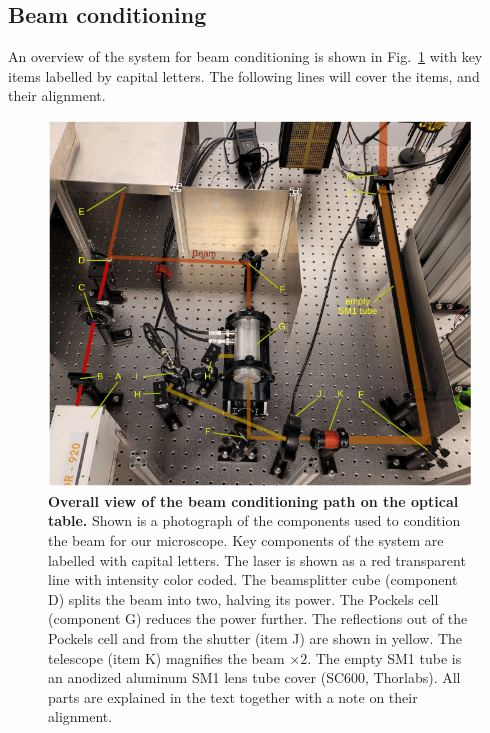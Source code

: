 \documentclass[10pt,letterpaper]{article}
\begin{document}
\subsection{Beam conditioning}
An overview of the system for beam conditioning is shown in Fig.~\ref{sfig1} with key items labelled by capital letters. The following lines will cover the items, and their alignment.
%
\begin{figure}[!t]
    \includegraphics[width=\textwidth]{sfig1.jpg}
    \caption{{\bf Overall view of the beam conditioning path on the optical table.} Shown is a photograph of the components used to condition the beam for our microscope. Key components of the system are labelled with capital letters. The laser is shown as a red transparent line with intensity color coded. The beamsplitter cube (component D) splits the beam into two, halving its power. The Pockels cell (component G) reduces the power further. The reflections out of the Pockels cell and from the shutter (item J) are shown in yellow. The telescope (item K) magnifies the beam $\times 2$. The empty SM1 tube is an anodized aluminum SM1 lens tube cover (SC600, Thorlabs). All parts are explained in the text together with a note on their alignment.}
    \label{sfig1}
\end{figure}
%
\end{document}
